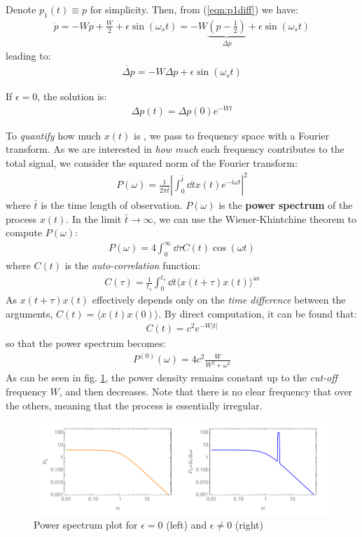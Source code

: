 \documentclass[../template.tex]{subfiles}
\begin{document}
Denote $p_1(t) \equiv p$ for simplicity. Then, from (\ref{eqn:p1diff}) we have:
\begin{align*}
    \dot{p} = - Wp + \frac{W}{2} + \epsilon \sin(\omega_s t) = - W\underbrace{\left(p-\frac{1}{2} \right) }_{\Delta p}+ \epsilon \sin (\omega_s t)
\end{align*}
leading to:
\begin{align*}
    \dot{\Delta p} = - W \Delta p + \epsilon \sin(\omega_s t)
\end{align*}

If $\epsilon = 0$, the solution is:
\begin{align*}
    \Delta p(t) = \Delta p(0) e^{-W t}
\end{align*}

To \textit{quantify} how much $x(t)$ is , we pass to frequency space with a Fourier transform. As we are interested in \textit{how much} each frequency contributes to the total signal, we consider the squared norm of the Fourier transform: 
\begin{align*}
    P(\omega) = \frac{1}{2 \pi \bar{t}} \left| \int_0^{\bar{t}} \dd{t} x(t) e^{-i \omega t} \right|^2
\end{align*}
where $\bar{t}$ is the time length of observation. $P(\omega)$ is the \textbf{power spectrum} of the process $x(t)$. In the limit $\bar{t} \to \infty$, we can use the Wiener-Khintchine theorem to compute $P(\omega)$:
\begin{align*}
    P(\omega) = 4 \int_0^\infty \dd{\tau} C(t) \cos(\omega t)
\end{align*}
where $C(t)$ is the \textit{auto-correlation} function:
\begin{align*}
    C(\tau) = \frac{1}{t_s} \int_0^{t_s} \dd{t} \langle x(t+ \tau) x(t) \rangle^{\mathrm{as}}
\end{align*} 
As $x(t+\tau) x(t)$ effectively depends only on the \textit{time difference} between the arguments, $C(t) = \langle x(t)x(0) \rangle$. By direct computation, it can be found that:
\begin{align*}
    C(t) = c^2 e^{-W|t|}
\end{align*}
so that the power spectrum becomes: 
\begin{align*}
    P^{(0)}(\omega) = 4c^2 \frac{W}{W^2 + \omega^2} 
\end{align*}
As can be seen in fig. \ref{fig:pw}, the power density remains constant up to the \textit{cut-off} frequency $W$, and then decreases. Note that there is no clear frequency that  over the others, meaning that the process is essentially irregular. 

\begin{figure} %
    \centering
    \includegraphics{image001.png}
    \caption{Power spectrum plot for $\epsilon = 0$ (left) and $\epsilon \neq 0$ (right)\label{fig:pw}}
\end{figure}
\end{document}
